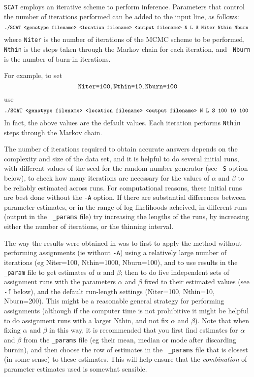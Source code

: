 \documentclass[11pt,titlepage,times,letterpaper]{article}
\def\SCAT{{\tt SCAT} }
\begin{document}
\SCAT employs an iterative scheme to perform inference. 
Parameters that control the number of iterations performed
can be added to the input line, as follows:
$$\text{{\small \tt ./SCAT <genotype filename> <location filename> <output
filename> N L S Niter Nthin Nburn }}$$ where {\tt Niter} is the number
of iterations of the MCMC scheme to be performed, {\tt Nthin} is the
steps taken through the Markov chain for each iteration, and {\tt
Nburn} is the number of burn-in iterations.

For example, to set
$$\text{{\tt Niter=100}}, \text{{\tt Nthin=10}}, \text{{\tt Nburn=100}}$$
use
$$\text{{\tt \small./SCAT <genotype filename> <location filename> <output
filename> N L S 100 10 100 }}$$ 
In fact, the above values are the
default values. Each iteration performs {\tt Nthin}
steps through the Markov chain.

The number of iterations required to obtain accurate answers depends
on the complexity and size of the data set, and it is helpful to do
several initial runs, with different values of the seed for the
random-number-generator (see {\tt -S} option below), to check how many
iterations are necessary for the values of $\alpha$ and $\beta$ to be
reliably estimated across runs. For computational reasons, these
initial runs are best done without the {\tt -A} option.  If there are
substantial differences between parameter estimates, or in the range
of log-likelihoods acheived, in different runs (output in the {\tt
\_params} file) try increasing the lengths of the runs, by increasing
either the number of iterations, or the thinning interval.

The way the results were obtained in \cite{wasser.etal.04} was to
first to apply the method without performing assignments (ie without
{\tt -A}) using a relatively large number of iterations (eg
{Niter=100, Nthin=1000, Nburn=100}), and to use results in the {\tt
\_param} file to get estimates of $\alpha$ and $\beta$; then to do
five independent sets of assignment runs with the parameters $\alpha$
and $\beta$ fixed to their estimated values (see {\tt -f} below), and
the default run-length settings (Niter=100, Nthin=10, Nburn=200). This
might be a reasonable general strategy for performing assignments
(although if the computer time is not prohibitive it might be helpful
to do assignment runs with a larger Nthin, and not fix $\alpha$ and
$\beta$). Note that when fixing $\alpha$ and $\beta$ in this way, it
is recommended that you first find estimates for $\alpha$ and $\beta$
from the {\tt \_params} file (eg their mean, median or mode after
discarding burnin), and then choose the row of estimates in the {\tt
\_params} file that is closest (in some sense) to these
estimates. This will help ensure that the {\it combination} of
parameter estimates used is somewhat sensible.
\end{document}
